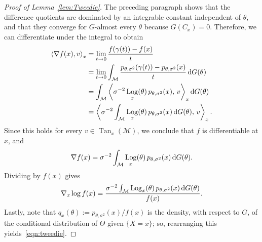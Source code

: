 \documentclass[preprint]{imsart}
\theoremstyle{plain}
\theoremstyle{definition}
\newcommand{\Mcal}{\mathcal{M}}
\newcommand{\diff}{\textnormal{d}}
\DeclareMathOperator{\Tan}{Tan}
\DeclareMathOperator{\Log}{Log}
\begin{document}
\begin{appendix}
\begin{proof}[Proof of Lemma~\ref{lem:Tweedie}]
    The preceding paragraph shows that the difference quotients are dominated by an integrable constant independent of $\theta$, and that they converge for $G$-almost every $\theta$ because $G(C_x)=0$.
    Therefore, we can differentiate under the integral to obtain
    \begin{align*}
        \left\langle \nabla f(x),v\right\rangle_x
        &= \lim_{t\to 0}\frac{f(\gamma(t))-f(x)}{t} \\
        &= \lim_{t\to 0}\int_{\Mcal}\frac{p_{\theta,\sigma^2}(\gamma(t))-p_{\theta,\sigma^2}(x)}{t}\,\diff G(\theta) \\
        &= \int_{\Mcal}
        \left\langle
            \sigma^{-2}\Log_x(\theta)\,p_{\theta,\sigma^2}(x),\,v
        \right\rangle_x
        \diff G(\theta) \\
        &= \left\langle
            \sigma^{-2}\int_{\Mcal}\Log_x(\theta)\,p_{\theta,\sigma^2}(x)\,\diff G(\theta),\,v
        \right\rangle_x.
    \end{align*}
    Since this holds for every $v\in\Tan_x(\Mcal)$, we conclude that $f$ is differentiable at $x$, and
    \[
        \nabla f(x)=\sigma^{-2}\int_{\Mcal}\Log_x(\theta)\,p_{\theta,\sigma^2}(x)\,\diff G(\theta).
    \]
    Dividing by $f(x)$ gives
    \[
        \nabla_x\log f(x)
        =
        \frac{\sigma^{-2}\int_{\Mcal}\Log_x(\theta)\,p_{\theta,\sigma^2}(x)\,\diff G(\theta)}{f(x)}.
    \]
    Lastly, note that $q_x(\theta):=p_{\theta,\sigma^2}(x)/f(x)$ is the density, with respect to $G$, of the conditional distribution of $\Theta$ given $\{X=x\}$; so, rearranging this yields~\eqref{eqn:tweedie}.
\end{proof}


\end{appendix}
\end{document}
